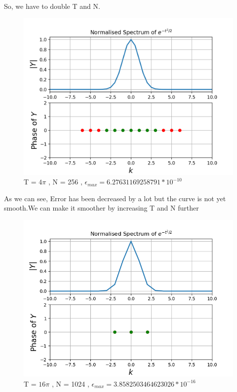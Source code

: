 \documentclass[12pt, a4paper]{report}
\begin{document}
\newline
So, we have to double T and N.
 \begin{figure}[!tbh]
   	\centering
   	\includegraphics[scale=0.7]{Q4b.png}
	\caption{T = $4\pi$ , N = 256 , $\epsilon_{max}  = 6.27631169258791 * 10^{-10} $}
 \end{figure} 
 \newpage
 As we can see, Error has been decreased by a lot but the curve is not yet smooth.We can make it smoother by increasing T and N further
 \begin{figure}[!tbh]
   	\centering
   	\includegraphics[scale=0.7]{Q4.png}
	\caption{T = $16\pi$ , N = 1024 , $\epsilon_{max}  = 3.8582503464623026 * 10 ^{-16} $}
 \end{figure} 
 \newpage
\end{document}
